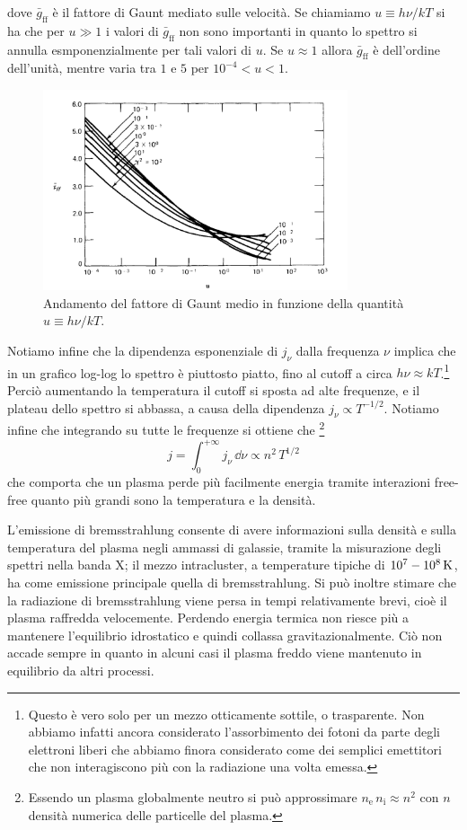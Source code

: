 dove $\bar{g}_\mathrm{ff}$ è il fattore di Gaunt mediato sulle velocità. Se chiamiamo $u \equiv h\nu/kT$ si ha che per $u\gg 1$ i valori di $\bar{g}_\mathrm{ff}$ non sono importanti in quanto lo spettro si annulla esmponenzialmente per tali valori di $u$. Se $u\approx 1$ allora $\bar{g}_\mathrm{ff}$ è dell'ordine dell'unità, mentre varia tra $1$ e $5$ per $10^{-4}<u<1$. 
\begin{figure}
\includegraphics[width=0.8\textwidth]{img/Gaunt}
\caption{Andamento del fattore di Gaunt medio in funzione della quantità $u \equiv h\nu/kT$.} \label{fig:Gaunt}
\end{figure}
Notiamo infine che la dipendenza esponenziale di $j_\nu$ dalla frequenza $\nu$ implica che in un grafico log-log lo spettro è piuttosto piatto, fino al cutoff a circa $h\nu \approx kT$.\footnote{Questo è vero solo per un mezzo otticamente sottile, o trasparente. Non abbiamo infatti ancora considerato l'assorbimento dei fotoni da parte degli elettroni liberi che abbiamo finora considerato come dei semplici emettitori che non interagiscono più con la radiazione una volta emessa.} Perciò aumentando la temperatura il cutoff si sposta ad alte frequenze, e il plateau dello spettro si abbassa, a causa della dipendenza $j_\nu \propto T^{-1/2}$. Notiamo infine che integrando su tutte le frequenze si ottiene che \footnote{Essendo un plasma globalmente neutro si può approssimare $n_\mathrm{e}\,n_\mathrm{i} \approx n^2$ con $n$ densità numerica delle particelle del plasma.}
\begin{equation}
j = \int_0^{+\infty} j_\nu \, \dd \nu \propto n^2\, T^{1/2}
\end{equation}
che comporta che un plasma perde più facilmente energia tramite interazioni free-free quanto più grandi sono la temperatura e la densità.

L'emissione di bremsstrahlung consente di avere informazioni sulla densità e sulla temperatura del plasma negli ammassi di galassie, tramite la misurazione degli spettri nella banda X; il mezzo intracluster, a temperature tipiche di $10^7-10^8\,\mathrm{ K}$, ha come emissione principale quella di bremsstrahlung. Si può inoltre stimare che la radiazione di bremsstrahlung viene persa in tempi relativamente brevi, cioè il plasma raffredda velocemente. Perdendo energia termica non riesce più a mantenere l'equilibrio idrostatico e quindi collassa gravitazionalmente. Ciò non accade sempre in quanto in alcuni casi il plasma freddo viene mantenuto in equilibrio da altri processi.


